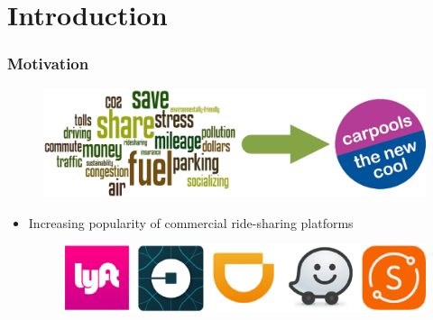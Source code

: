 \documentclass[t]{beamer}
\begin{document}
\section*{Introduction}
\begin{frame}\frametitle{Motivation}
\begin{figure}
	\centering
    \includegraphics[width = 0.75\columnwidth]{carpool.eps}
\end{figure}
\begin{itemize}
\item<2-> Increasing popularity of commercial ride-sharing platforms
\begin{figure}
	\centering
    \includegraphics[width = 0.55\columnwidth]{ride-sharings.eps}
\end{figure}
\end{itemize}
\end{frame}
\end{document}
